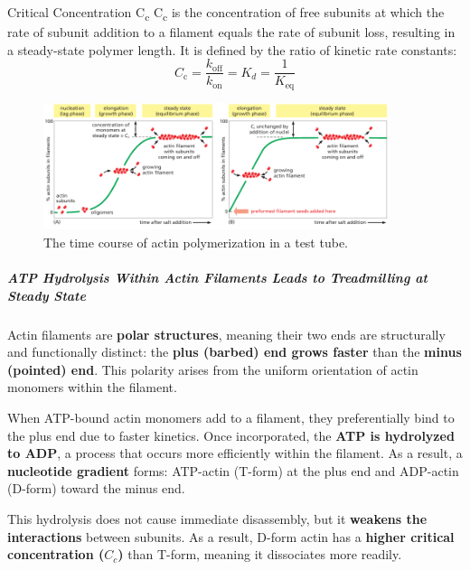 \documentclass[../main.tex]{subfiles}
\begin{document}
\begin{RemarkWithTitel}{Critical Concentration C\textsubscript{c}}
	C\textsubscript{c} is the concentration of free subunits at which the rate of subunit addition to a filament equals the rate of subunit loss, resulting in a steady-state polymer length. It is defined by the ratio of kinetic rate constants:
	\[
	C_{\text{c}} = \frac{k_{\text{off}}}{k_{\text{on}}} = K_d = \frac{1}{K_{\text{eq}}}
	\]
\end{RemarkWithTitel} 
 
\begin{figure}[H]
	\centering
	\includegraphics[width = 0.9\textwidth]{7}
	\caption{The time course of actin polymerization in a test tube.}
	\label{}
\end{figure}

\subparagraph{ATP Hydrolysis Within Actin Filaments Leads to Treadmilling at Steady State}
Actin filaments are \textbf{polar structures}, meaning their two ends are structurally and functionally distinct: the \textbf{plus (barbed) end grows faster} than the \textbf{minus (pointed) end}. This polarity arises from the uniform orientation of actin monomers within the filament.

When ATP-bound actin monomers add to a filament, they preferentially bind to the plus end due to faster kinetics. Once incorporated, the \textbf{ATP is hydrolyzed to ADP}, a process that occurs more efficiently within the filament. As a result, a \textbf{nucleotide gradient} forms: ATP-actin (T-form) at the plus end and ADP-actin (D-form) toward the minus end.

This hydrolysis does not cause immediate disassembly, but it \textbf{weakens the interactions} between subunits. As a result, D-form actin has a \textbf{higher critical concentration ($C_c$)} than T-form, meaning it dissociates more readily.
\end{document}
